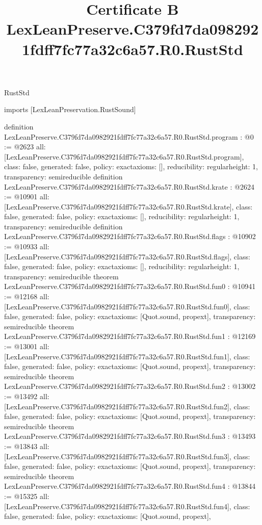 \begin{lexlean}{RustStd}
\title{Certificate B LexLeanPreserve.C379fd7da0982921fdff7fc77a32c6a57.R0.RustStd}
\begin{coremodule}
imports [LexLeanPreservation.RustSound]

definition LexLeanPreserve.C379fd7da0982921fdff7fc77a32c6a57.R0.RustStd.program : @0 := @2623 {
  all: [LexLeanPreserve.C379fd7da0982921fdff7fc77a32c6a57.R0.RustStd.program],
  class: false,
  generated: false,
  policy: exact{axioms: []},
  reducibility: regular{height: 1},
  transparency: semireducible
}
definition LexLeanPreserve.C379fd7da0982921fdff7fc77a32c6a57.R0.RustStd.krate : @2624 := @10901 {
  all: [LexLeanPreserve.C379fd7da0982921fdff7fc77a32c6a57.R0.RustStd.krate],
  class: false,
  generated: false,
  policy: exact{axioms: []},
  reducibility: regular{height: 1},
  transparency: semireducible
}
definition LexLeanPreserve.C379fd7da0982921fdff7fc77a32c6a57.R0.RustStd.flags : @10902 := @10933 {
  all: [LexLeanPreserve.C379fd7da0982921fdff7fc77a32c6a57.R0.RustStd.flags],
  class: false,
  generated: false,
  policy: exact{axioms: []},
  reducibility: regular{height: 1},
  transparency: semireducible
}
theorem LexLeanPreserve.C379fd7da0982921fdff7fc77a32c6a57.R0.RustStd.fun0 : @10941 := @12168 {
  all: [LexLeanPreserve.C379fd7da0982921fdff7fc77a32c6a57.R0.RustStd.fun0],
  class: false,
  generated: false,
  policy: exact{axioms: [Quot.sound, propext]},
  transparency: semireducible
}
theorem LexLeanPreserve.C379fd7da0982921fdff7fc77a32c6a57.R0.RustStd.fun1 : @12169 := @13001 {
  all: [LexLeanPreserve.C379fd7da0982921fdff7fc77a32c6a57.R0.RustStd.fun1],
  class: false,
  generated: false,
  policy: exact{axioms: [Quot.sound, propext]},
  transparency: semireducible
}
theorem LexLeanPreserve.C379fd7da0982921fdff7fc77a32c6a57.R0.RustStd.fun2 : @13002 := @13492 {
  all: [LexLeanPreserve.C379fd7da0982921fdff7fc77a32c6a57.R0.RustStd.fun2],
  class: false,
  generated: false,
  policy: exact{axioms: [Quot.sound, propext]},
  transparency: semireducible
}
theorem LexLeanPreserve.C379fd7da0982921fdff7fc77a32c6a57.R0.RustStd.fun3 : @13493 := @13843 {
  all: [LexLeanPreserve.C379fd7da0982921fdff7fc77a32c6a57.R0.RustStd.fun3],
  class: false,
  generated: false,
  policy: exact{axioms: [Quot.sound, propext]},
  transparency: semireducible
}
theorem LexLeanPreserve.C379fd7da0982921fdff7fc77a32c6a57.R0.RustStd.fun4 : @13844 := @15325 {
  all: [LexLeanPreserve.C379fd7da0982921fdff7fc77a32c6a57.R0.RustStd.fun4],
  class: false,
  generated: false,
  policy: exact{axioms: [Quot.sound, propext]},
}
\end{coremodule}
\end{lexlean}
